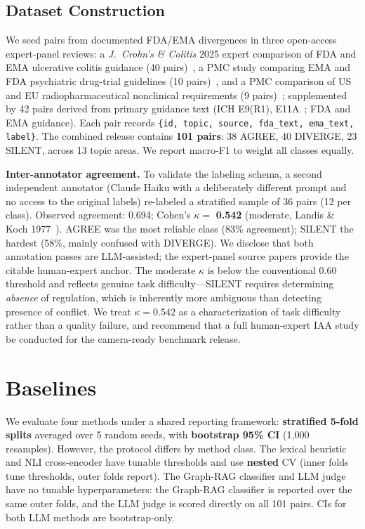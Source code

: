\documentclass[sigconf]{acmart}
\begin{document}
\subsection{Dataset Construction}

We seed pairs from documented FDA/EMA divergences in three open-access
expert-panel reviews: a \textit{J.\ Crohn's \& Colitis} 2025 expert comparison
of FDA and EMA ulcerative colitis guidance (40 pairs)~\cite{uc2025jcc}, a PMC
study comparing EMA and FDA psychiatric drug-trial guidelines (10
pairs)~\cite{pmc8157504}, and a PMC comparison of US and EU
radiopharmaceutical nonclinical requirements (9 pairs)~\cite{pmc6529498};
supplemented by 42 pairs derived from primary guidance text (ICH E9(R1),
E11A~\cite{iche11a2024}; FDA and EMA guidance). Each pair records \texttt{\{id,
topic, source, fda\_text, ema\_text, label\}}. The combined release contains
\textbf{101 pairs}: 38 AGREE, 40 DIVERGE, 23 SILENT, across 13 topic areas.
We report macro-F1 to weight all classes equally.

\textbf{Inter-annotator agreement.} To validate the labeling schema, a second
independent annotator (Claude Haiku with a deliberately different prompt and no
access to the original labels) re-labeled a stratified sample of 36 pairs (12
per class). Observed agreement: 0.694; Cohen's $\kappa =$ \textbf{0.542}
(moderate, Landis \& Koch 1977~\cite{landis1977kappa}). AGREE was the most
reliable class (83\% agreement); SILENT the hardest (58\%, mainly confused with
DIVERGE). We disclose that both annotation passes are LLM-assisted; the
expert-panel source papers provide the citable human-expert anchor. The moderate
$\kappa$ is below the conventional 0.60 threshold and reflects genuine task
difficulty---SILENT requires determining \textit{absence} of regulation, which
is inherently more ambiguous than detecting presence of conflict. We treat
$\kappa = 0.542$ as a characterization of task difficulty rather than a quality
failure, and recommend that a full human-expert IAA study be conducted for the
camera-ready benchmark release.

\section{Baselines}

We evaluate four methods under a shared reporting framework:
\textbf{stratified 5-fold splits} averaged over 5 random seeds, with
\textbf{bootstrap 95\% CI} (1{,}000 resamples). However, the protocol differs by
method class. The lexical heuristic and NLI cross-encoder have tunable
thresholds and use \textbf{nested} CV (inner folds tune thresholds, outer folds
report). The Graph-RAG classifier and LLM judge have no tunable
hyperparameters: the Graph-RAG classifier is reported over the same outer
folds, and the LLM judge is scored directly on all 101 pairs. CIs for both LLM
methods are bootstrap-only.
\end{document}
